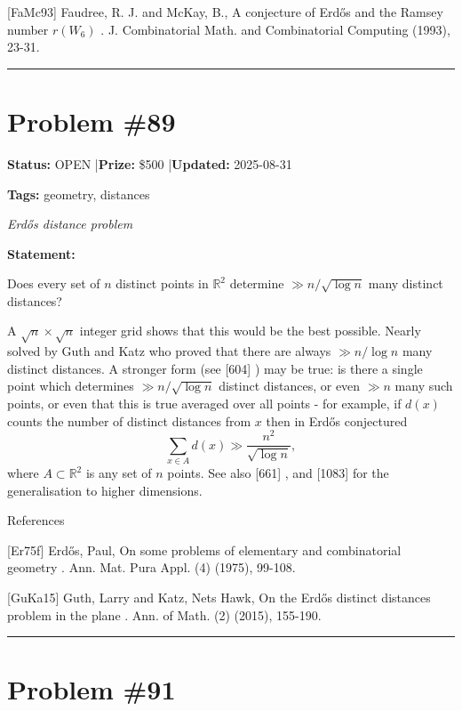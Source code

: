 \documentclass{article}
\begin{document}
[FaMc93] Faudree, R. J. and McKay, B., A conjecture of Erd\H{o}s and the Ramsey number $r(W_6)$ . J. Combinatorial Math. and Combinatorial Computing (1993), 23-31.

\noindent\rule{\linewidth}{0.4pt}


\section{Problem \#89}
\label{prob:89}

\noindent\textbf{Status:} OPEN \quad|\quad \textbf{Prize:} \$500 \quad|\quad \textbf{Updated:} 2025-08-31

\noindent\textbf{Tags:} geometry, distances

\medskip
\noindent\textit{Erdős distance problem}


\noindent\textbf{Statement:}

Does every set of $n$ distinct points in $\mathbb{R}^2$ determine $\gg n/\sqrt{\log n}$ many distinct distances?




A $\sqrt{n}\times\sqrt{n}$ integer grid shows that this would be the best possible. Nearly solved by Guth and Katz \cite{GuKa15} who proved that there are always $\gg n/\log n$ many distinct distances. A stronger form (see [604] ) may be true: is there a single point which determines $\gg n/\sqrt{\log n}$ distinct distances, or even $\gg n$ many such points, or even that this is true averaged over all points - for example, if $d(x)$ counts the number of distinct distances from $x$ then in \cite{Er75f} Erd\H{o}s conjectured\[\sum_{x\in A}d(x) \gg \frac{n^2}{\sqrt{\log n}},\]where $A\subset \mathbb{R}^2$ is any set of $n$ points. See also [661] , and [1083] for the generalisation to higher dimensions.




References

[Er75f] Erd\H{o}s, Paul, On some problems of elementary and combinatorial geometry . Ann. Mat. Pura Appl. (4) (1975), 99-108.

[GuKa15] Guth, Larry and Katz, Nets Hawk, On the Erd\H{o}s distinct distances problem in the plane . Ann. of Math. (2) (2015), 155-190.

\noindent\rule{\linewidth}{0.4pt}


\section{Problem \#91}
\label{prob:91}
\end{document}
